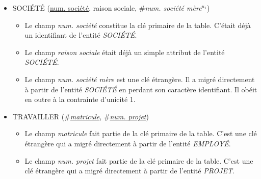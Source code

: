 \documentclass[a4paper]{article}
\newcommand{\relat}[1]{\textsc{#1}}
\newcommand{\attr}[1]{#1}
\newcommand{\prim}[1]{\uline{#1}}
\newcommand{\foreign}[1]{\#\textsl{#1}}
\begin{document}
\begin{itemize}
  \item \relat{SOCIÉTÉ} (\prim{num. société}, \attr{raison sociale}, \foreign{num. société mère}$^{u_1}$)
  \begin{itemize}
    \item Le champ \emph{num. société} constitue la clé primaire de la table. C'était déjà un identifiant de l'entité \emph{SOCIÉTÉ}.
    \item Le champ \emph{raison sociale} était déjà un simple attribut de l'entité \emph{SOCIÉTÉ}.
    \item Le champ \emph{num. société mère} est une clé étrangère. Il a migré directement à partir de l'entité \emph{SOCIÉTÉ} en perdant son caractère identifiant. Il obéit en outre à la contrainte d'unicité 1.
  \end{itemize}

  \item \relat{TRAVAILLER} (\foreign{\prim{matricule}}, \foreign{\prim{num. projet}})
  \begin{itemize}
    \item Le champ \emph{matricule} fait partie de la clé primaire de la table. C'est une clé étrangère qui a migré directement à partir de l'entité \emph{EMPLOYÉ}.
    \item Le champ \emph{num. projet} fait partie de la clé primaire de la table. C'est une clé étrangère qui a migré directement à partir de l'entité \emph{PROJET}.
  \end{itemize}

\end{itemize}
\end{document}
